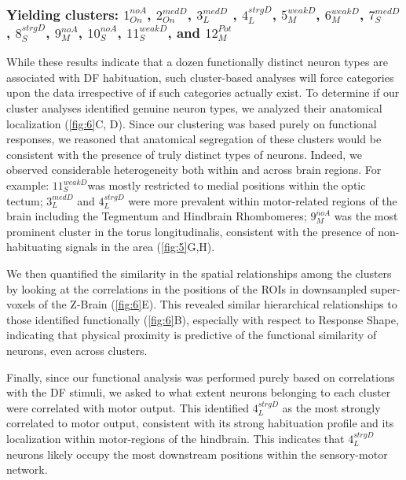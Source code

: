 \documentclass[9pt,lineno]{RandlettLab_elife}
\begin{document}
\subsubsection{Yielding clusters: $1_{On}^{noA}$, $2_{On}^{medD}$, $3_{L}^{medD}$ , $4_{L}^{strgD}$, $5_{M}^{weakD}$, $6_{M}^{weakD}$, $7_{S}^{medD}$, $8_{S}^{strgD}$, $9_{M}^{noA}$, $10_{S}^{noA}$, $11_{S}^{weakD}$, and $12_{M}^{Pot}$}

\vspace{5mm}
While these results indicate that a dozen functionally distinct neuron types are associated with DF habituation, such cluster-based analyses will force categories upon the data irrespective of if such categories actually exist. To determine if our cluster analyses identified genuine neuron types, we analyzed their anatomical localization (\autoref{fig:6}C, D). Since our clustering was based purely on functional responses, we reasoned that anatomical segregation of these clusters would be consistent with the presence of truly distinct types of neurons. Indeed, we observed considerable heterogeneity both within and across brain regions. For example: 
$11_{S}^{weakD}$was mostly restricted to medial positions within the optic tectum; 
$3_{L}^{medD}$ and $4_{L}^{strgD}$ were more prevalent within motor-related regions of the brain including the Tegmentum and Hindbrain Rhombomeres; 
$9_{M}^{noA}$ was the most prominent cluster in the torus longitudinalis, consistent with the presence of non-habituating signals in the area (\autoref{fig:5}G,H). 

We then quantified the similarity in the spatial relationships among the clusters by looking at the correlations in the positions of the ROIs in downsampled super-voxels of the Z-Brain (\autoref{fig:6}E). This revealed similar hierarchical relationships to those identified functionally (\autoref{fig:6}B), especially with respect to Response Shape, indicating that physical proximity is predictive of the functional similarity of neurons, even across clusters. 

Finally, since our functional analysis was performed purely based on correlations with the DF stimuli, we asked to what extent neurons belonging to each cluster were correlated with motor output. This identified $4_{L}^{strgD}$ as the most strongly correlated to motor output, consistent with its strong habituation profile and its localization within motor-regions of the hindbrain. This indicates that $4_{L}^{strgD}$ neurons likely occupy the most downstream positions within the sensory-motor network. 
\end{document}
